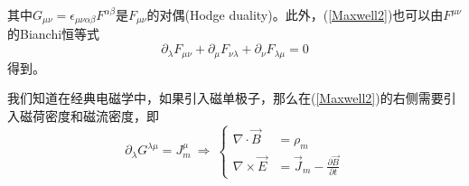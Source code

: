 \begin{itemize}
        其中$G_{\mu\nu}=\epsilon_{\mu\nu\alpha\beta}F^{\alpha\beta}$是$F_{\mu\nu}$的对偶(Hodge duality)。此外，(\ref{Maxwell2})也可以由$F^{\mu\nu}$的Bianchi恒等式$$\partial_\lambda F_{\mu\nu}+\partial_\mu F_{\nu\lambda}+\partial_\nu F_{\lambda\mu}=0$$得到。

        我们知道在经典电磁学中，如果引入磁单极子，那么在(\ref{Maxwell2})的右侧需要引入磁荷密度和磁流密度，即
        \begin{equation}
            \partial_\lambda G^{\lambda\mu}=J_m^\mu
            \ \Rightarrow\ \left\{
                \begin{split}
                    \nabla\cdot\vec{B}&=\rho_m \\
                    \nabla\times\vec{E}&=\vec{J}_m-\frac{\partial\vec{B}}{\partial t}
                \end{split}
            \right.
        \end{equation}


\end{itemize}
